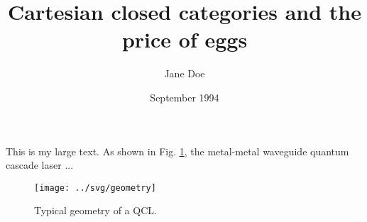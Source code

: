 \documentclass{article}
\title{Cartesian closed categories
  and the price of eggs}
\author{Jane Doe}
\date{September 1994}
\begin{document}
\huge
This is my large text. As shown in Fig.
\ref{fig:geometry}, the metal-metal waveguide
quantum cascade laser ...

\begin{figure}
  \centering
  \texttt{[image: ../svg/geometry]}
  \caption{Typical geometry of a QCL.}
  \label{fig:geometry}
\end{figure}
\end{document}

